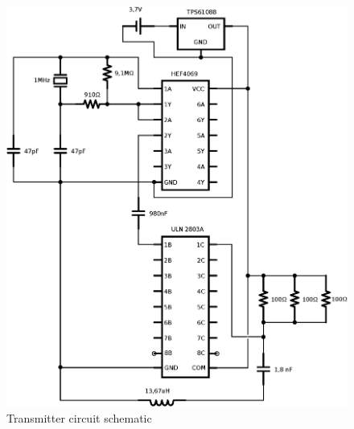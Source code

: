 \begin{figure}[H]
\begin{center}
\includegraphics[width=1\textwidth]{./images/circuitv5}
\caption{Transmitter circuit schematic}
\end{center}
\end{figure}

